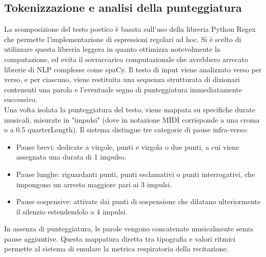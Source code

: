 \subsection{Tokenizzazione e analisi della punteggiatura}
La scomposizione del testo poetico è basata sull'uso della libreria Python Regex che permette l'implementazione 
di espressioni regolari ad hoc. Si è scelto di utilizzare questa libreria leggera in quanto ottimizza notevolmente la computazione, ed evita il sovraccarico 
computazionale che avrebbero arrecato librerie di NLP complesse come spaCy. Il testo di input viene analizzato verso per verso,  e per ciascuno, viene 
restituita una sequenza strutturata di dizionari contenenti una parola e l'eventuale segno di punteggiatura immediatamente successivo.\\
Una volta isolata la punteggiatura del testo, viene mappata su specifiche durate musicali, misurate in "impulsi" (dove in notazione MIDI corrisponde 
a una croma o a 0.5 quarterLength). Il sistema distingue tre categorie di pause infra-verso:
\begin{itemize}
      \item Pause brevi: dedicate a virgole, punti e virgola o due punti, a cui viene assegnata una durata di 1 impulso.
      \item Pause lunghe: riguardanti punti,  punti esclamativi o punti interrogativi, che impongono un arresto maggiore pari ai 3 impulsi.
      \item Pause sospensive: attivate dai punti di sospensione che dilatano ulteriormente il silenzio estendendolo a 4 impulsi.
\end{itemize}
In assenza di punteggiatura, le parole vengono concatenate musicalmente senza pause aggiuntive. Questa mappatura diretta tra tipografia e valori 
ritmici permette al sistema di emulare la metrica respiratoria della recitazione.


